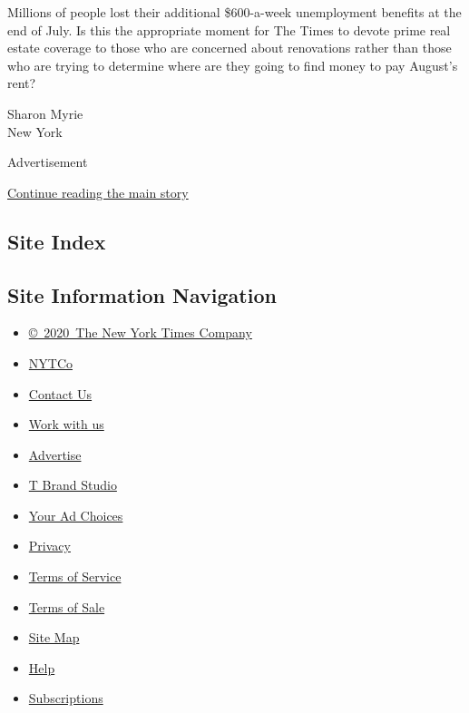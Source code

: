Millions of people lost their additional \$600-a-week unemployment
benefits at the end of July. Is this the appropriate moment for The
Times to devote prime real estate coverage to those who are concerned
about renovations rather than those who are trying to determine where
are they going to find money to pay August's rent?

Sharon Myrie\\
New York

Advertisement

\protect\hyperlink{after-bottom}{Continue reading the main story}

\hypertarget{site-index}{%
\subsection{Site Index}\label{site-index}}

\hypertarget{site-information-navigation}{%
\subsection{Site Information
Navigation}\label{site-information-navigation}}

\begin{itemize}
\tightlist
\item
  \href{https://help.nytimes3xbfgragh.onion/hc/en-us/articles/115014792127-Copyright-notice}{©~2020~The
  New York Times Company}
\end{itemize}

\begin{itemize}
\tightlist
\item
  \href{https://www.nytco.com/}{NYTCo}
\item
  \href{https://help.nytimes3xbfgragh.onion/hc/en-us/articles/115015385887-Contact-Us}{Contact
  Us}
\item
  \href{https://www.nytco.com/careers/}{Work with us}
\item
  \href{https://nytmediakit.com/}{Advertise}
\item
  \href{http://www.tbrandstudio.com/}{T Brand Studio}
\item
  \href{https://www.nytimes3xbfgragh.onion/privacy/cookie-policy\#how-do-i-manage-trackers}{Your
  Ad Choices}
\item
  \href{https://www.nytimes3xbfgragh.onion/privacy}{Privacy}
\item
  \href{https://help.nytimes3xbfgragh.onion/hc/en-us/articles/115014893428-Terms-of-service}{Terms
  of Service}
\item
  \href{https://help.nytimes3xbfgragh.onion/hc/en-us/articles/115014893968-Terms-of-sale}{Terms
  of Sale}
\item
  \href{https://spiderbites.nytimes3xbfgragh.onion}{Site Map}
\item
  \href{https://help.nytimes3xbfgragh.onion/hc/en-us}{Help}
\item
  \href{https://www.nytimes3xbfgragh.onion/subscription?campaignId=37WXW}{Subscriptions}
\end{itemize}
